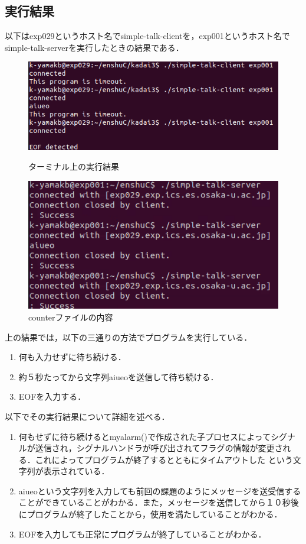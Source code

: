 \documentclass[dvipdfmx]{jarticle}
\begin{document}
\subsection{実行結果}
以下はexp029というホスト名でsimple-talk-clientを，exp001というホスト名でsimple-talk-serverを実行したときの結果である．
\begin{figure}[htbp]
    \begin{minipage}[b]{0.45\linewidth}
      \centering
      \includegraphics[keepaspectratio, scale=0.5]{result3-3-2-1.png}
      \caption{ターミナル上の実行結果}
    \end{minipage}
    \begin{minipage}[b]{0.45\linewidth}
      \centering
      \includegraphics[keepaspectratio, scale=0.5]{result3-3-2-2.png}
      \caption{counterファイルの内容}
    \end{minipage}
  \end{figure}
上の結果では，以下の三通りの方法でプログラムを実行している．
\begin{enumerate}
    \item 何も入力せずに待ち続ける．
    \item 約５秒たってから文字列aiueoを送信して待ち続ける．
    \item EOFを入力する．
\end{enumerate}
以下でその実行結果について詳細を述べる．
\begin{enumerate}
    \item 何もせずに待ち続けるとmyalarm()で作成された子プロセスによってシグナルが送信され，シグナルハンドラが呼び出されてフラグの情報が変更される．これによってプログラムが終了するとともにタイムアウトした
    という文字列が表示されている．
    \item aiueoという文字列を入力しても前回の課題のようにメッセージを送受信することができていることがわかる．また，メッセージを送信してから１０秒後にプログラムが終了したことから，使用を満たしていることがわかる．
    \item EOFを入力しても正常にプログラムが終了していることがわかる．
\end{enumerate}
\end{document}
